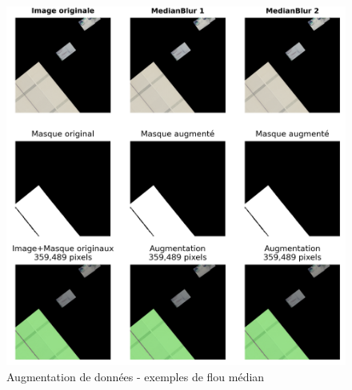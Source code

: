 \begin{figure}[H]
    \centering
    \includegraphics[width=1\linewidth]{02-main/figures/ch3/ch36_augmentations_06_flou_median.png}
    \caption{Augmentation de données - exemples de flou médian}
    \label{fig:ch36_augmentations_06_flou_median}
\end{figure}

